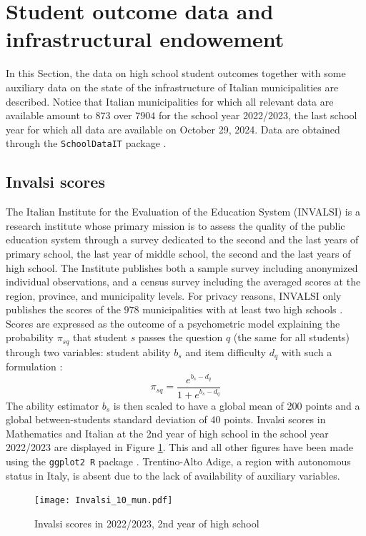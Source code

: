 \documentclass{book}
\begin{document}
\section{Student outcome data and infrastructural endowement} \label{section:data}
In this Section, the data on high school student outcomes together with some auxiliary data on the state of the infrastructure of Italian municipalities are described. 
Notice that Italian municipalities for which all relevant data are available amount to $873$ over $7904$ for the school year 2022/2023, the last school year for which all data are available on October 29, 2024. Data are obtained through the \texttt{SchoolDataIT} package \cite{SchoolDataIT}. 
 
\subsection{Invalsi scores}\label{Par:Invalsi} The Italian Institute for the Evaluation of the Education System (INVALSI) is a research institute whose primary mission is to assess the quality of the public education system through a survey dedicated to the second and the last years of primary school, the last year of middle school, the second and the last years of high school. The Institute publishes both a sample survey including anonymized individual observations, and a census survey including the averaged scores at the region, province, and municipality levels. For privacy reasons, INVALSI only publishes the scores of the $978$ municipalities with at least two high schools \cite{Invalsi_IS}. Scores are expressed as the outcome of a psychometric model explaining the probability $\pi_{sq}$ that student $s$ passes the question $q$ (the same for all students) through two variables: student ability $b_s$ and item difficulty $d_q$ with such a formulation \citep[][Chapter 5]{PISA}:
 $$
 \pi_{sq} = \frac{e^{b_s - d_q}}{1 + e^{b_s - d_q}}
 $$
The ability estimator $b_s$ is then scaled to have a global mean of 200 points and a global between-students standard deviation of 40 points.%
Invalsi scores in Mathematics and Italian at the 2nd year of high school in the school year 2022/2023 are displayed in Figure \ref{fig:Invalsi}. This and all other figures have been made using the \texttt{ggplot2 R} package \citep{ggplot}. Trentino-Alto Adige, a region with autonomous status in Italy, is absent due to the lack of availability of auxiliary variables.
\begin{figure}
  \centering
  \texttt{[image: Invalsi\_10\_mun.pdf]} 
  \caption{Invalsi scores in 2022/2023, 2nd year of high school}
  \label{fig:Invalsi}
\end{figure}
\end{document}
